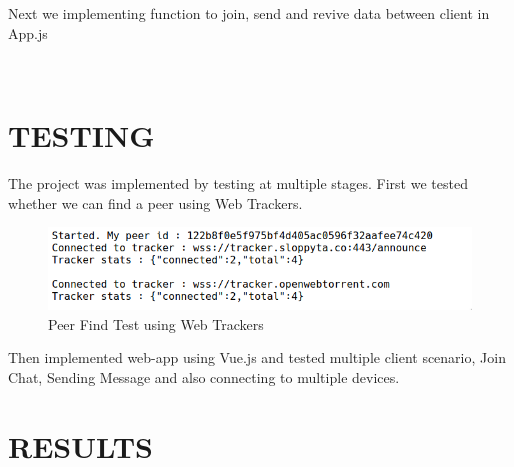 \documentclass{fisatproject}
\begin{document}
    

Next we implementing function to join, send and revive data between client in App.js
         \vspace{0.6cm}
 	 \begin{lstlisting}[language=java]
 	 
 	 \end{lstlisting}


\chapter{TESTING}
The project was implemented by testing at multiple stages. First we tested whether we can find a peer using Web Trackers.
	\begin{center}
	\begin{figure}[h]
		
		\includegraphics[scale=.37]{testpeer.png}
		\caption{Peer Find Test using Web Trackers}
		
	\end{figure}
\end{center}

Then implemented web-app using Vue.js and tested multiple client scenario, Join Chat, Sending Message and also connecting to multiple devices.
\chapter{RESULTS}
\end{document}

